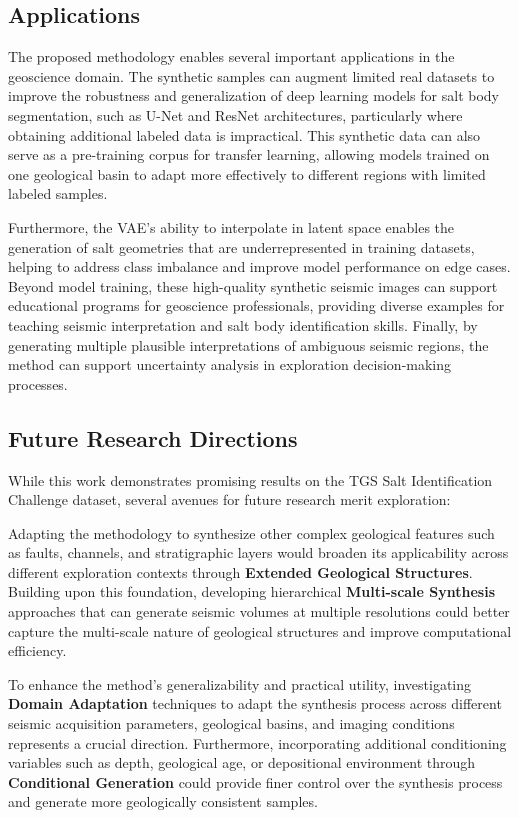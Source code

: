\documentclass{ieeeaccess}
\begin{document}
\subsection{Applications}

The proposed methodology enables several important applications in the geoscience domain. The synthetic samples can augment limited real datasets to improve the robustness and generalization of deep learning models for salt body segmentation, such as U-Net and ResNet architectures, particularly where obtaining additional labeled data is impractical. This synthetic data can also serve as a pre-training corpus for transfer learning, allowing models trained on one geological basin to adapt more effectively to different regions with limited labeled samples.

Furthermore, the VAE's ability to interpolate in latent space enables the generation of salt geometries that are underrepresented in training datasets, helping to address class imbalance and improve model performance on edge cases. Beyond model training, these high-quality synthetic seismic images can support educational programs for geoscience professionals, providing diverse examples for teaching seismic interpretation and salt body identification skills. Finally, by generating multiple plausible interpretations of ambiguous seismic regions, the method can support uncertainty analysis in exploration decision-making processes.


\subsection{Future Research Directions}

While this work demonstrates promising results on the TGS Salt Identification Challenge dataset, several avenues for future research merit exploration:

Adapting the methodology to synthesize other complex geological features such as faults, channels, and stratigraphic layers would broaden its applicability across different exploration contexts through \textbf{Extended Geological Structures}. Building upon this foundation, developing hierarchical \textbf{Multi-scale Synthesis} approaches that can generate seismic volumes at multiple resolutions could better capture the multi-scale nature of geological structures and improve computational efficiency.

To enhance the method's generalizability and practical utility, investigating \textbf{Domain Adaptation} techniques to adapt the synthesis process across different seismic acquisition parameters, geological basins, and imaging conditions represents a crucial direction. Furthermore, incorporating additional conditioning variables such as depth, geological age, or depositional environment through \textbf{Conditional Generation} could provide finer control over the synthesis process and generate more geologically consistent samples.
\end{document}
